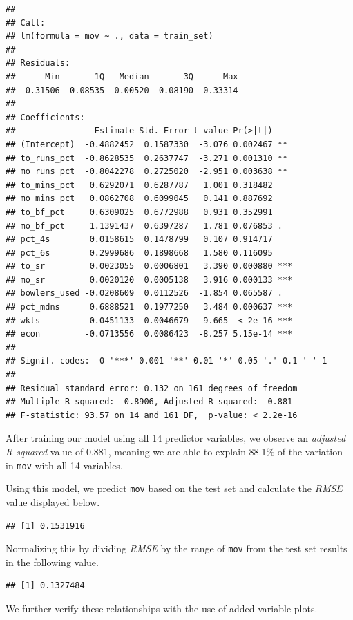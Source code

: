 \documentclass[
]{article}
\begin{document}
\begin{verbatim}
## 
## Call:
## lm(formula = mov ~ ., data = train_set)
## 
## Residuals:
##      Min       1Q   Median       3Q      Max 
## -0.31506 -0.08535  0.00520  0.08190  0.33314 
## 
## Coefficients:
##                Estimate Std. Error t value Pr(>|t|)    
## (Intercept)  -0.4882452  0.1587330  -3.076 0.002467 ** 
## to_runs_pct  -0.8628535  0.2637747  -3.271 0.001310 ** 
## mo_runs_pct  -0.8042278  0.2725020  -2.951 0.003638 ** 
## to_mins_pct   0.6292071  0.6287787   1.001 0.318482    
## mo_mins_pct   0.0862708  0.6099045   0.141 0.887692    
## to_bf_pct     0.6309025  0.6772988   0.931 0.352991    
## mo_bf_pct     1.1391437  0.6397287   1.781 0.076853 .  
## pct_4s        0.0158615  0.1478799   0.107 0.914717    
## pct_6s        0.2999686  0.1898668   1.580 0.116095    
## to_sr         0.0023055  0.0006801   3.390 0.000880 ***
## mo_sr         0.0020120  0.0005138   3.916 0.000133 ***
## bowlers_used -0.0208609  0.0112526  -1.854 0.065587 .  
## pct_mdns      0.6888521  0.1977250   3.484 0.000637 ***
## wkts          0.0451133  0.0046679   9.665  < 2e-16 ***
## econ         -0.0713556  0.0086423  -8.257 5.15e-14 ***
## ---
## Signif. codes:  0 '***' 0.001 '**' 0.01 '*' 0.05 '.' 0.1 ' ' 1
## 
## Residual standard error: 0.132 on 161 degrees of freedom
## Multiple R-squared:  0.8906, Adjusted R-squared:  0.881 
## F-statistic: 93.57 on 14 and 161 DF,  p-value: < 2.2e-16
\end{verbatim}

After training our model using all 14 predictor variables, we observe an
\emph{adjusted R-squared} value of 0.881, meaning we are able to explain
88.1\% of the variation in \texttt{mov} with all 14 variables.

Using this model, we predict \texttt{mov} based on the test set and
calculate the \emph{RMSE} value displayed below.

\begin{verbatim}
## [1] 0.1531916
\end{verbatim}

Normalizing this by dividing \emph{RMSE} by the range of \texttt{mov}
from the test set results in the following value.

\begin{verbatim}
## [1] 0.1327484
\end{verbatim}

We further verify these relationships with the use of added-variable
plots.\\
\end{document}
